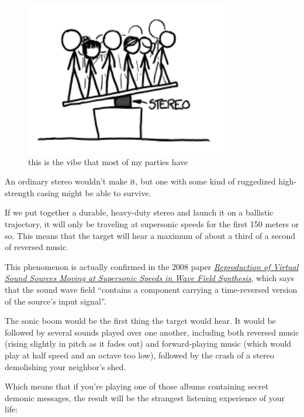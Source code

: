\begin{figure}[!htbp]
\centering
\includegraphics[scale=0.5, max width=0.8\textwidth]{imgs/a/37/stereo_standing.png}
\caption{this is the vibe that most of my parties have}
\end{figure}

{An ordinary stereo wouldn’t make it, but one with some kind of ruggedized high-strength casing might be able to survive.}

{If we put together a durable, heavy-duty stereo and launch it on a ballistic trajectory, it will only be traveling at supersonic speeds for the first 150 meters or so. This means that the target will hear a maximum of about a third of a second of reversed music.}

{This phenomenon is actually confirmed in the 2008 paper \emph{ \href{http://www.researchgate.net/publication/230702229\_Reproduction\_of\_Virtual\_Sound\_Sources\_Moving\_at\_Supersonic\_Speeds\_in\_Wave\_Field\_Synthesis}{Reproduction of Virtual Sound Sources Moving at Supersonic Speeds in Wave Field Synthesis}}, which says that the sound wave field “contains a component carrying a time-reversed version of the source’s input signal”.}

{The sonic boom would be the first thing the target would hear. It would be followed by several sounds played over one another, including both reversed music (rising slightly in pitch as it fades out) and forward-playing music (which would play at half speed and an octave too low), followed by the crash of a stereo demolishing your neighbor’s shed.}

{Which means that if you’re playing one of those albums containing secret demonic messages, the result will be the strangest listening experience of your life:}

